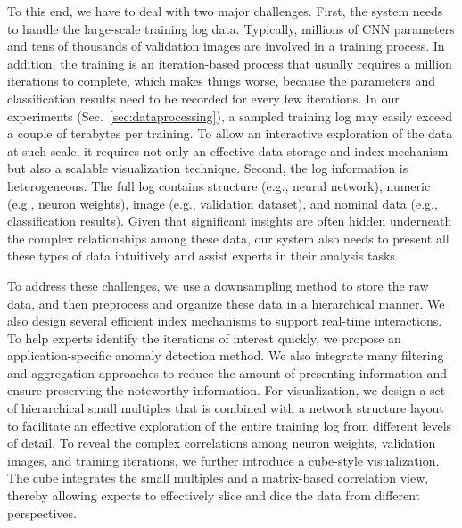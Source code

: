 \documentclass[format=acmsmall, review=false, screen=true]{acmart}
\newcommand{\ti}{\textcolor[rgb]{0,0,0}}
\begin{document}
To this end, we have to deal with two major challenges.
First, the system needs to handle the large-scale training log data.
Typically, millions of CNN parameters and tens of thousands of validation images are involved in a training process.
In addition, the training is an iteration-based process that usually requires a million iterations to complete, which makes things worse, because the parameters and classification results need to be recorded for every few iterations.
In our experiments (Sec.~\ref{sec:dataprocessing}), a sampled training log may easily exceed a couple of terabytes per training.
To allow an interactive exploration of the data at such scale, it requires not only an effective data storage and index mechanism but also a scalable visualization technique.
Second, the log information is heterogeneous.
The full log contains structure (e.g., neural network), numeric (e.g., neuron weights), image (e.g., validation dataset), and nominal data (e.g., classification results).
Given that significant insights are often hidden underneath the complex relationships among these data, our system also needs to present all these types of data intuitively and assist experts in their analysis tasks.

To address these challenges, we use a downsampling method to store the raw data, and then preprocess and organize these data in a hierarchical manner.
We also design several efficient index mechanisms to support real-time interactions.
To help experts identify the iterations of interest quickly, we propose an application-specific anomaly detection method.
\ti{We also integrate many filtering and aggregation approaches to reduce the amount of presenting information and ensure preserving the noteworthy information.}
For visualization, we design a set of hierarchical small multiples that is combined with a network structure layout to facilitate an effective exploration of the entire training log from different levels of detail.
To reveal the complex correlations among neuron weights, validation images, and training iterations, we further introduce a cube-style visualization.
The cube integrates the small multiples and a matrix-based correlation view, thereby allowing experts to effectively slice and dice the data from different perspectives.
\end{document}
